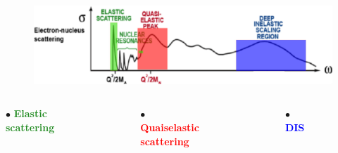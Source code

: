 \documentclass[12pt,usenames,dvipsnames]{beamer}
\begin{document}
\begin{frame}

\begin{figure}[]
\centering
\includegraphics[width=12cm]{../images/Thesis/E_nucleus_spect_DIS.png}
\end{figure}
\begin{columns}[t]
$\bullet$ \textbf{\textcolor{ForestGreen}{Elastic scattering}}
\begin{figure}[]
\includegraphics[width=3.5cm]{../images/elast_draw.png}
\end{figure}
$\bullet$ \textbf{\textcolor{red}{Quaiselastic scattering}}
\vspace{-10pt}
\begin{figure}[]
\includegraphics[width=3.5cm]{../images/quais_draw.png}
\end{figure}
$\bullet$ \textbf{\textcolor{blue}{DIS}}
\vspace{8pt}
\begin{figure}[]
\includegraphics[width=3.5cm]{../images/dis_draw.png}
\end{figure}

\end{columns}
\end{frame}
\end{document}
